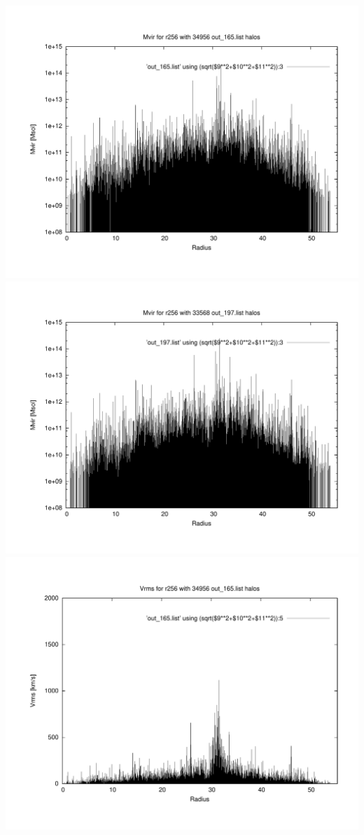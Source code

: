 \includegraphics[scale=0.3]{r256/h100/red_st14_log1/plot_mvir_out_165.pdf}
\includegraphics[scale=0.3]{r256/h100/red_st14_log1/plot_mvir_out_197.pdf}
\includegraphics[scale=0.3]{r256/h100/red_st14_log1/plot_Vrms_out_165.pdf}
